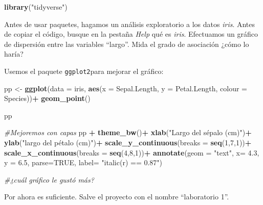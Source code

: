 \documentclass[]{article}
\newenvironment{Shaded}{\begin{snugshade}}{\end{snugshade}}
\newcommand{\CommentTok}[1]{\textcolor[rgb]{0.56,0.35,0.01}{\textit{#1}}}
\newcommand{\DataTypeTok}[1]{\textcolor[rgb]{0.13,0.29,0.53}{#1}}
\newcommand{\DecValTok}[1]{\textcolor[rgb]{0.00,0.00,0.81}{#1}}
\newcommand{\FloatTok}[1]{\textcolor[rgb]{0.00,0.00,0.81}{#1}}
\newcommand{\KeywordTok}[1]{\textcolor[rgb]{0.13,0.29,0.53}{\textbf{#1}}}
\newcommand{\NormalTok}[1]{#1}
\newcommand{\OperatorTok}[1]{\textcolor[rgb]{0.81,0.36,0.00}{\textbf{#1}}}
\newcommand{\OtherTok}[1]{\textcolor[rgb]{0.56,0.35,0.01}{#1}}
\newcommand{\StringTok}[1]{\textcolor[rgb]{0.31,0.60,0.02}{#1}}
\begin{document}
\begin{Shaded}
\begin{Highlighting}[]
\KeywordTok{library}\NormalTok{(}\StringTok{"tidyverse"}\NormalTok{)}
\end{Highlighting}
\end{Shaded}

Antes de usar paquetes, hagamos un análisis exploratorio a los datos
\emph{iris}. Antes de copiar el código, busque en la pestaña \emph{Help}
qué es \emph{iris}. Efectuamos un gráfico de dispersión entre las
variables ``largo''. Mida el grado de asociación ¿cómo lo haría?

\begin{Shaded}
\end{Shaded}

Usemos el paquete \texttt{ggplot2}para mejorar el gráfico:

\begin{Shaded}
\begin{Highlighting}[]
\NormalTok{pp <-}\StringTok{ }\KeywordTok{ggplot}\NormalTok{(}\DataTypeTok{data =}\NormalTok{ iris, }\KeywordTok{aes}\NormalTok{(}\DataTypeTok{x =}\NormalTok{ Sepal.Length, }\DataTypeTok{y =}\NormalTok{ Petal.Length, }\DataTypeTok{colour =}\NormalTok{ Species))}\OperatorTok{+}
\StringTok{      }\KeywordTok{geom_point}\NormalTok{()}
  
\NormalTok{pp  }
  
\CommentTok{#Mejoremos con capas}
\NormalTok{pp }\OperatorTok{+}\StringTok{  }\KeywordTok{theme_bw}\NormalTok{()}\OperatorTok{+}
\StringTok{      }\KeywordTok{xlab}\NormalTok{(}\StringTok{"Largo del sépalo (cm)"}\NormalTok{)}\OperatorTok{+}
\StringTok{      }\KeywordTok{ylab}\NormalTok{(}\StringTok{"largo del pétalo (cm)"}\NormalTok{)}\OperatorTok{+}
\StringTok{      }\KeywordTok{scale_y_continuous}\NormalTok{(}\DataTypeTok{breaks =} \KeywordTok{seq}\NormalTok{(}\DecValTok{1}\NormalTok{,}\DecValTok{7}\NormalTok{,}\DecValTok{1}\NormalTok{))}\OperatorTok{+}
\StringTok{      }\KeywordTok{scale_x_continuous}\NormalTok{(}\DataTypeTok{breaks =} \KeywordTok{seq}\NormalTok{(}\DecValTok{4}\NormalTok{,}\DecValTok{8}\NormalTok{,}\DecValTok{1}\NormalTok{))}\OperatorTok{+}
\StringTok{      }\KeywordTok{annotate}\NormalTok{(}\DataTypeTok{geom =} \StringTok{"text"}\NormalTok{, }\DataTypeTok{x=} \FloatTok{4.3}\NormalTok{, }\DataTypeTok{y =} \FloatTok{6.5}\NormalTok{, }\DataTypeTok{parse=}\OtherTok{TRUE}\NormalTok{, }\DataTypeTok{label=} \StringTok{"italic(r) == 0.87"}\NormalTok{)}
      
\CommentTok{#¿cuál gráfico le gustó más? }
\end{Highlighting}
\end{Shaded}

Por ahora es suficiente. Salve el proyecto con el nombre ``laboratorio
1''.
\end{document}
